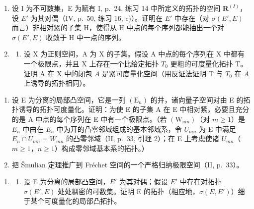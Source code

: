 \exercisegroup

\begin{enumerate}
\def\labelenumi{\arabic{enumi})}
\item
  设 I 为不可数集，E 为赋有 I, p.~24, 练习 14 中所定义的拓扑的空间 \(\mathbf{R}^{(I)}\)，设 \(E'\) 为其对偶（IV, p.~50, 练习 16, c)）。证明在 \(E'\) 中存在（对 \(\sigma(E', E)\) 而言）非相对紧的子集 H，使得从 H 中点的每个序列都能抽出一个对 \(\sigma(E', E)\) 收敛于 H 中一点的序列。
\item
  \begin{enumerate}
  \def\labelenumii{\alph{enumii})}
  \tightlist
  \item
    设 X 为正则空间，A 为 X 的子集。假设 A 中点的每个序列在 X 中都有一个极限点，并且 X 上存在一个比给定拓扑 \(T_{0}\) 更粗的可度量化拓扑 T。证明 A 在 X 中的闭包 \(\overline{A}\) 是紧可度量化空间（用反证法证明 T 与 \(T_{0}\) 在 \(\overline{A}\) 上诱导的拓扑相同）。
  \end{enumerate}
\end{enumerate}

\begin{enumerate}
\def\labelenumi{\alph{enumi})}
\setcounter{enumi}{1}
\item
  设 E 为分离的局部凸空间，它是一列 \((\mathrm{E}_{n})\) 的并，诸向量子空间对由 E 的拓扑诱导的拓扑可度量化。证明：为使 E 的子集 A 在 E 中相对紧，必要且充分的是 A 中点的每个序列在 E 中有一个极限点。（若 \((\mathrm{W}_{mn})\)（对 \(m \geqslant 1\)）是 \(E_{n}\) 中由在 \(E_{n}\) 中为开的凸零邻域组成的基本邻域系，令 \(U_{mn}\) 为 E 中满足 \(E_{n} \cap U_{mn} = W_{mn}\) 的凸零邻域（II, p.~33, 引理 2）；在 E 上考虑使诸 \(U_{mn}\)（\(m \geqslant 1\)，\(n \geqslant 1\)）构成零邻域基本系的拓扑。）
\item
  把 Šmulian 定理推广到 Fréchet 空间的一个严格归纳极限空间（II, p.~33）。
\end{enumerate}

\begin{enumerate}
\def\labelenumi{\arabic{enumi})}
\setcounter{enumi}{2}
\tightlist
\item
  \begin{enumerate}
  \def\labelenumii{\alph{enumii})}
  \tightlist
  \item
    设 E 为分离的局部凸空间，\(E'\) 为其对偶；假设 \(E'\) 中存在对拓扑 \(\sigma(E', E)\) 处处稠密的可数集。证明 E 的拓扑（相应地，\(\sigma(E, E')\)）细于某个可度量化的局部凸拓扑。
  \end{enumerate}
\end{enumerate}


